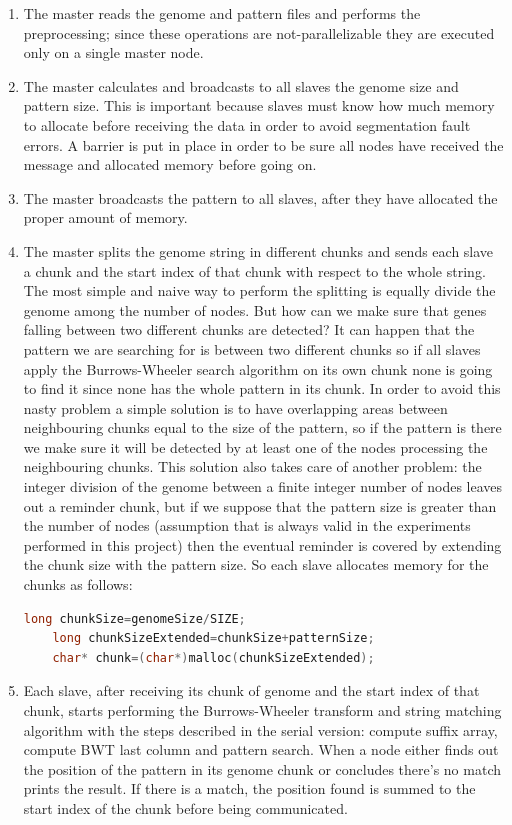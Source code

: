 \documentclass[final,5p,times,twocolumn,authoryear]{elsarticle}
\begin{document}
\begin{enumerate}
    \item The master reads the genome and pattern files and performs the preprocessing; since these operations are not-parallelizable they are executed only on a single master node.
    \item The master calculates and broadcasts to all slaves the genome size and pattern size. This is important because slaves must know how much memory to allocate before receiving the data in order to avoid segmentation fault errors. A barrier is put in place in order to be sure all nodes have received the message and allocated memory before going on.
    \item The master broadcasts the pattern to all slaves, after they have allocated the proper amount of memory.
    \item The master splits the genome string in different chunks and sends each slave a chunk and the start index of that chunk with respect to the whole string. The most simple and naive way to perform the splitting is equally divide the genome among the number of nodes. But how can we make sure that genes falling between two different chunks are detected? It can happen that the pattern we are searching for is between two different chunks so if all slaves apply the Burrows-Wheeler search algorithm on its own chunk none is going to find it since none has the whole pattern in its chunk. In order to avoid this nasty problem a simple solution is to have overlapping areas between neighbouring chunks equal to the size of the pattern, so if the pattern is there we make sure it will be detected by at least one of the nodes processing the neighbouring chunks. This solution also takes care of another problem: the integer division of the genome between a finite integer number of nodes leaves out a reminder chunk, but if we suppose that the pattern size is greater than the number of nodes (assumption that is always valid in the experiments performed in this project) then the eventual reminder is covered by extending the chunk size with the pattern size. So each slave allocates memory for the chunks as follows:
    \begin{lstlisting}[language=c++]
    long chunkSize=genomeSize/SIZE;
    long chunkSizeExtended=chunkSize+patternSize;
    char* chunk=(char*)malloc(chunkSizeExtended);
    \end{lstlisting}
    \item Each slave, after receiving its chunk of genome and the start index of that chunk, starts performing the Burrows-Wheeler transform and string matching algorithm with the steps described in the serial version: compute suffix array, compute BWT last column and pattern search. When a node either finds out the position of the pattern in its genome chunk or concludes there's no match prints the result. If there is a match, the position found is summed to the start index of the chunk before being communicated.
\end{enumerate}
\end{document}
